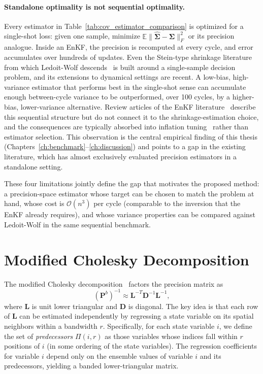 \paragraph{Standalone optimality is not sequential optimality.}
Every estimator in Table~\ref{tab:cov_estimator_comparison} is optimized for a single-shot loss: given one sample, minimize $\mathbb{E}\|\hat{\boldsymbol{\Sigma}} - \boldsymbol{\Sigma}\|_F^2$ or its precision analogue. Inside an EnKF, the precision is recomputed at every cycle, and error accumulates over hundreds of updates. Even the Stein-type shrinkage literature from which Ledoit-Wolf descends~\citep{stein1956inadmissibility,james1961estimation,efron1975data} is built around a single-sample decision problem, and its extensions to dynamical settings are recent. A low-bias, high-variance estimator that performs best in the single-shot sense can accumulate enough between-cycle variance to be outperformed, over 100 cycles, by a higher-bias, lower-variance alternative. Review articles of the EnKF literature~\citep{houtekamer2016review,reich2015probabilistic} describe this sequential structure but do not connect it to the shrinkage-estimation choice, and the consequences are typically absorbed into inflation tuning~\citep{anderson2009spatially,zhang2004impacts} rather than estimator selection. This observation is the central empirical finding of this thesis (Chapters~\ref{ch:benchmark}--\ref{ch:discussion}) and points to a gap in the existing literature, which has almost exclusively evaluated precision estimators in a standalone setting.

These four limitations jointly define the gap that motivates the proposed method: a precision-space estimator whose target can be chosen to match the problem at hand, whose cost is $\mathcal{O}(n^3)$ per cycle (comparable to the inversion that the EnKF already requires), and whose variance properties can be compared against Ledoit-Wolf in the same sequential benchmark.

\section{Modified Cholesky Decomposition}
\label{sec:cholesky}

The modified Cholesky decomposition~\citep{nino2018ensemble} factors the precision matrix as
\begin{equation}
\label{eq:cholesky}
(\mathbf{P}^b)^{-1} \approx \mathbf{L}^{-T} \mathbf{D}^{-1} \mathbf{L}^{-1},
\end{equation}
where $\mathbf{L}$ is unit lower triangular and $\mathbf{D}$ is diagonal. The key idea is that each row of $\mathbf{L}$ can be estimated independently by regressing a state variable on its spatial neighbors within a bandwidth $r$. Specifically, for each state variable $i$, we define the set of \emph{predecessors} $\Pi(i, r)$ as those variables whose indices fall within $r$ positions of $i$ (in some ordering of the state variables). The regression coefficients for variable $i$ depend only on the ensemble values of variable $i$ and its predecessors, yielding a banded lower-triangular matrix.

